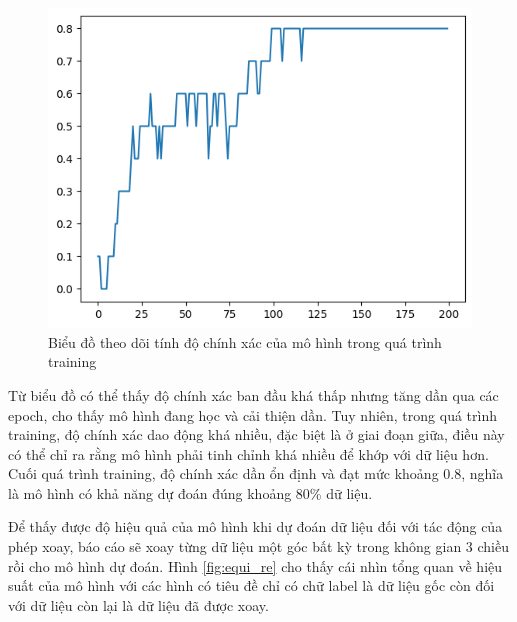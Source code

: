 \begin{figure}[H]
    \centering
    \includegraphics[width=0.7\linewidth]{Images/TFN/acc_re.png}
    \caption{Biểu đồ theo dõi tính độ chính xác của mô hình trong quá trình training}
    \label{fig:acc_track}
\end{figure}

Từ biểu đồ có thể thấy độ chính xác ban đầu khá thấp nhưng tăng dần qua các epoch, cho thấy mô hình đang học và cải thiện dần. Tuy nhiên, trong quá trình training, độ chính xác dao động khá nhiều, đặc biệt là ở giai đoạn giữa, điều này có thể chỉ ra rằng mô hình phải tinh chỉnh khá nhiều để khớp với dữ liệu hơn. Cuối quá trình training, độ chính xác dần ổn định và đạt mức khoảng 0.8, nghĩa là mô hình có khả năng dự đoán đúng khoảng 80\% dữ liệu.

Để thấy được độ hiệu quả của mô hình khi dự đoán dữ liệu đối với tác động của phép xoay, báo cáo sẽ xoay từng dữ liệu một góc bất kỳ trong không gian 3 chiều rồi cho mô hình dự đoán. Hình \ref{fig:equi_re} cho thấy cái nhìn tổng quan về hiệu suất của mô hình với các hình có tiêu đề chỉ có chữ label là dữ liệu gốc còn đối với dữ liệu còn lại là dữ liệu đã được xoay.

